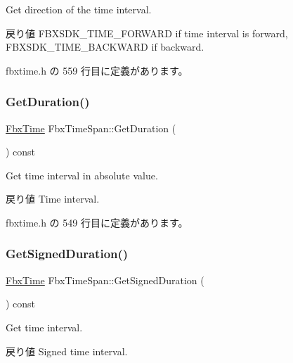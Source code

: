 Get direction of the time interval. \begin{DoxyReturn}{戻り値}
{\ttfamily F\+B\+X\+S\+D\+K\+\_\+\+T\+I\+M\+E\+\_\+\+F\+O\+R\+W\+A\+RD} if time interval is forward, {\ttfamily F\+B\+X\+S\+D\+K\+\_\+\+T\+I\+M\+E\+\_\+\+B\+A\+C\+K\+W\+A\+RD} if backward. 
\end{DoxyReturn}


 fbxtime.\+h の 559 行目に定義があります。

\mbox{\label{class_fbx_time_span_a292fce840a8caee4247157e24cbd787c}} 
\subsubsection{\texorpdfstring{Get\+Duration()}{GetDuration()}}
{\footnotesize\ttfamily \hyperlink{class_fbx_time}{Fbx\+Time} Fbx\+Time\+Span\+::\+Get\+Duration (\begin{DoxyParamCaption}{ }\end{DoxyParamCaption}) const\hspace{0.3cm}{\ttfamily [inline]}}

Get time interval in absolute value. \begin{DoxyReturn}{戻り値}
Time interval. 
\end{DoxyReturn}


 fbxtime.\+h の 549 行目に定義があります。

\mbox{\label{class_fbx_time_span_a73c72bdec019e41044aa6f4afb59fef3}} 
\subsubsection{\texorpdfstring{Get\+Signed\+Duration()}{GetSignedDuration()}}
{\footnotesize\ttfamily \hyperlink{class_fbx_time}{Fbx\+Time} Fbx\+Time\+Span\+::\+Get\+Signed\+Duration (\begin{DoxyParamCaption}{ }\end{DoxyParamCaption}) const\hspace{0.3cm}{\ttfamily [inline]}}

Get time interval. \begin{DoxyReturn}{戻り値}
Signed time interval. 
\end{DoxyReturn}


